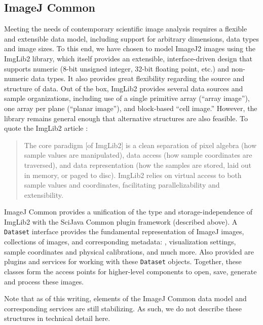 \documentclass{bmcart}
\begin{document}
\subsection*{ImageJ Common}

Meeting the needs of contemporary scientific image analysis requires a flexible
and extensible data model, including support for arbitrary dimensions, data
types and image sizes. To this end, we have chosen to model ImageJ2 images
using the ImgLib2 library, which itself provides an extensible,
interface-driven design that supports numeric (8-bit unsigned integer, 32-bit
floating point, etc.) and non-numeric data types. It also provides great
flexibility regarding the source and structure of data. Out of the box, ImgLib2
provides several data sources and sample organizations, including use of a
single primitive array (``array image''), one array per plane (``planar
image''), and block-based ``cell image.'' However, the library remains general
enough that alternative structures are also feasible. To quote the ImgLib2
article \cite{imglib2}:

\begin{quote}
  The core paradigm [of ImgLib2] is a clean separation of pixel algebra (how
  sample values are manipulated), data access (how sample coordinates are
  traversed), and data representation (how the samples are stored, laid out in
  memory, or paged to disc). ImgLib2 relies on virtual access to both sample
  values and coordinates, facilitating parallelizability and extensibility.
\end{quote}

ImageJ Common provides a unification of the type and storage-independence of
ImgLib2 with the SciJava Common plugin framework (described above). A
\texttt{Dataset} interface provides the fundamental representation of ImageJ
images, collections of images, and corresponding metadata: ,
visualization settings, sample coordinates and physical calibrations, and much
more. Also provided are plugins and services for working with these
\texttt{Dataset} objects. Together, these classes form the access points for
higher-level components to open, save, generate and process these images.

Note that as of this writing, elements of the ImageJ Common data model and
corresponding services are still stabilizing. As such, we do not describe these
structures in technical detail here.
\end{document}
